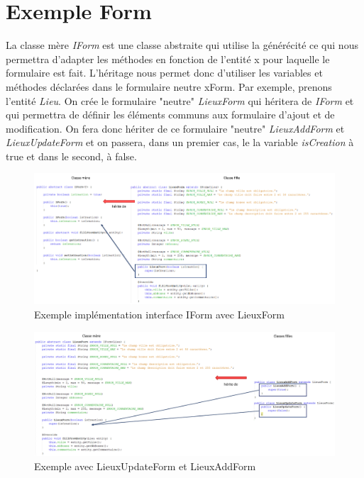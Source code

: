 	\section{Exemple Form}

		La classe mère \textit{IForm} est une classe abstraite qui utilise la générécité ce qui nous permettra d'adapter les méthodes en fonction de l'entité x pour laquelle le formulaire est fait. L'héritage nous permet donc d'utiliser les variables et méthodes déclarées dans le formulaire neutre xForm.\newline
		Par exemple, prenons l'entité \textit{Lieu}. On crée le formulaire "neutre" \textit{LieuxForm} qui héritera de \textit{IForm} et qui permettra de définir les éléments communs aux formulaire d'ajout et de modification.\newline
		On fera donc hériter de ce formulaire "neutre" \textit{LieuxAddForm} et \textit{LieuxUpdateForm} et on passera, dans un premier cas, le la variable \textit{isCreation} à true et dans le second, à false.

		\begin{figure}[H]
			\centering\includegraphics[width=1\textwidth, keepaspectratio]{res/IForm.png}
			\caption{Exemple implémentation interface IForm avec LieuxForm}
		\end{figure}

		\begin{figure}[H]
			\centering\includegraphics[width=1\textwidth, keepaspectratio]{res/formClassFilles.png}
			\caption{Exemple avec LieuxUpdateForm et LieuxAddForm}
		\end{figure}

